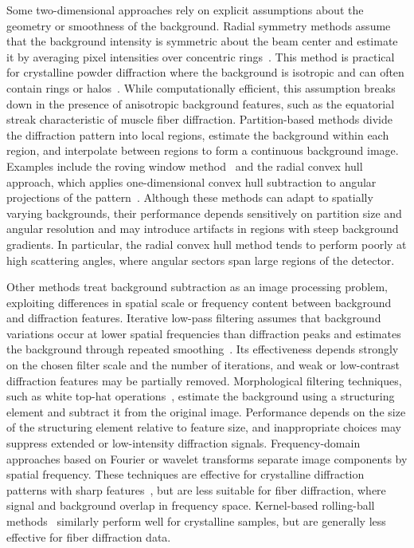 \documentclass[iucr]{iucrjournals}
\begin{document}
Some two-dimensional approaches rely on explicit assumptions about the geometry or smoothness of the background. Radial symmetry methods assume that the background intensity is symmetric about the beam center and estimate it by averaging pixel intensities over concentric rings~\cite{rajkumar2007fibrefix}. This method is practical for crystalline powder diffraction where the background is isotropic and can often contain rings or halos~\cite{ashiotis2015pyfai}. While computationally efficient, this assumption breaks down in the presence of anisotropic background features, such as the equatorial streak characteristic of muscle fiber diffraction. Partition-based methods divide the diffraction pattern into local regions, estimate the background within each region, and interpolate between regions to form a continuous background image. Examples include the roving window method~\cite{HeEtAl2007} and the radial convex hull approach, which applies one-dimensional convex hull subtraction to angular projections of the pattern~\cite{lee2019musclex}. Although these methods can adapt to spatially varying backgrounds, their performance depends sensitively on partition size and angular resolution and may introduce artifacts in regions with steep background gradients. In particular, the radial convex hull method tends to perform poorly at high scattering angles, where angular sectors span large regions of the detector.

Other methods treat background subtraction as an image processing problem, exploiting differences in spatial scale or frequency content between background and diffraction features. Iterative low-pass filtering assumes that background variations occur at lower spatial frequencies than diffraction peaks and estimates the background through repeated smoothing~\cite{IvanovaMakowski1998}. Its effectiveness depends strongly on the chosen filter scale and the number of iterations, and weak or low-contrast diffraction features may be partially removed. Morphological filtering techniques, such as white top-hat operations~\cite{GonzalezWoodsDIP4e}, estimate the background using a structuring element and subtract it from the original image. Performance depends on the size of the structuring element relative to feature size, and inappropriate choices may suppress extended or low-intensity diffraction signals. Frequency-domain approaches based on Fourier or wavelet transforms separate image components by spatial frequency. These techniques are effective for crystalline diffraction patterns with sharp features~\cite{PolarBackground2024, WaveletBiomedOptExpress2021, renedecotret2017baseline}, but are less suitable for fiber diffraction, where signal and background overlap in frequency space. Kernel-based rolling-ball methods~\cite{Sternberg1983} similarly perform well for crystalline samples, but are generally less effective for fiber diffraction data.
\end{document}
